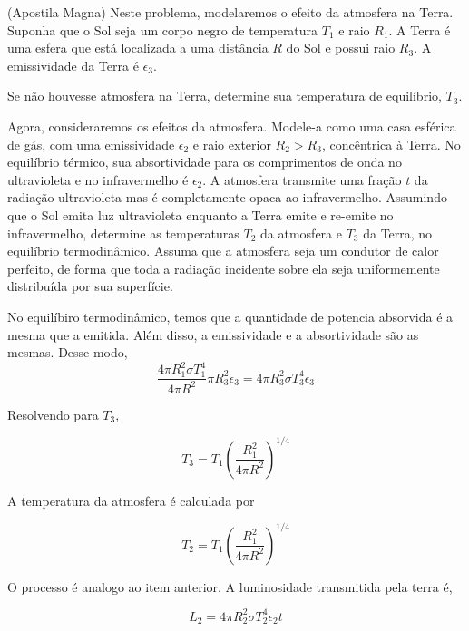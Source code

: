 \documentclass[11pt]{article}
\begin{document}
\begin{pproblem} (Apostila Magna)
    Neste problema, modelaremos o efeito da atmosfera na Terra. Suponha que o Sol
seja um corpo negro de temperatura \(T_1\) e raio \(R_1\). A Terra é uma esfera que está localizada
a uma distância \(R\) do Sol e possui raio \(R_3\). A emissividade da Terra é \(\epsilon_3\).
\begin{alternativas}
    \item Se não houvesse atmosfera na Terra, determine sua temperatura de equilíbrio, \(T_3\).
    \item  Agora, consideraremos os efeitos da atmosfera. Modele-a como uma casa esférica de gás,
    com uma emissividade \(\epsilon_2\) e raio exterior \(R_2>R_3\), concêntrica à Terra. No equilíbrio térmico,
    sua absortividade para os comprimentos de onda no ultravioleta e no infravermelho é \(\epsilon_2\). A
    atmosfera transmite uma fração \(t\) da radiação ultravioleta mas é completamente opaca ao
    infravermelho. Assumindo que o Sol emita luz ultravioleta enquanto a Terra emite e re-emite
    no infravermelho, determine as temperaturas \(T_2\) da atmosfera e \(T_3\) da Terra, no equilíbrio
    termodinâmico. Assuma que a atmosfera seja um condutor de calor perfeito, de forma que
    toda a radiação incidente sobre ela seja uniformemente distribuída por sua superfície.
\end{alternativas}

\begin{pssolution*}{}{}
    \begin{alternativas}
        \item No equilíbiro termodinâmico, temos que a quantidade de potencia absorvida é a mesma que a emitida. Além disso, a emissividade e a absortividade são as mesmas. Desse modo, 
        \[\frac{4\pi R_1^2\sigma T_1^4}{4\pi R^2}\pi R_3^2\epsilon_3 = 4\pi R_3^2\sigma T_3^4\epsilon_3\]

        Resolvendo para \(T_3\), 

        \[\boxed{T_3 = T_1\left(\frac{R_1^2}{4\pi R^2}\right)^{1/4}}\]

         \item A temperatura da atmosfera é calculada por 
         
         \[T_2 = T_1\left(\frac{R_1^2}{4\pi R^2 }\right)^{1/4}\]

         O processo é analogo ao item anterior. A luminosidade transmitida pela terra é, 

         \[L_2 = {4\pi R_2^2\sigma T_2^4\epsilon_2} t\]


\end{alternativas}
\end{pssolution*}
\end{pproblem}
\end{document}
